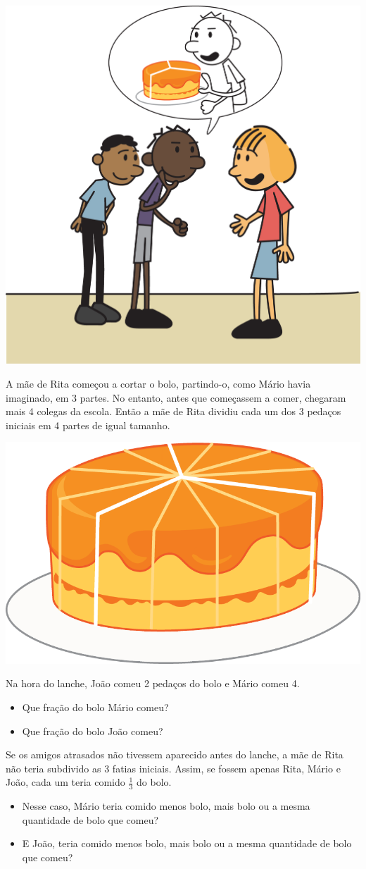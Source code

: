 \begin{center}
\includegraphics[width=.5\textwidth, keepaspectratio]{../media/cap4/secoes/pngs/ativ4_fig01.png}
\end{center}

A mãe de Rita começou a cortar o bolo, partindo-o, como Mário havia imaginado, em 3 partes. No entanto, antes que começassem a comer, chegaram mais 4 colegas da escola. Então a mãe de Rita dividiu cada um dos 3 pedaços iniciais em 4 partes de igual tamanho.

\begin{center}
\includegraphics[width=.25\textwidth, keepaspectratio]{../media/cap4/secoes/pngs/ativ4_fig02.png}
\end{center}



Na hora do lanche, João comeu 2 pedaços do bolo e Mário comeu 4.
\begin{itemize} %
  \item     Que fração do bolo Mário comeu?
  \item     Que fração do bolo João comeu?
\end{itemize} %

Se os amigos atrasados não tivessem aparecido antes do lanche, a mãe de Rita não teria subdivido as 3 fatias iniciais. Assim, se fossem apenas Rita, Mário e João, cada um teria comido $\frac{1}{3}$ do bolo.
\begin{itemize} %
  \item     Nesse caso, Mário teria comido menos bolo, mais bolo ou a mesma quantidade de bolo que comeu?
  \item     E João, teria comido menos bolo, mais bolo ou a mesma quantidade de bolo que comeu?
\end{itemize} %


